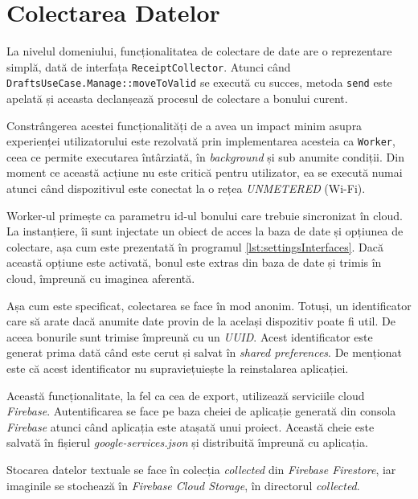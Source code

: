 \section{Colectarea Datelor}

La nivelul domeniului, funcționalitatea de colectare de date are o reprezentare simplă, dată de interfața \texttt{ReceiptCollector}. Atunci când \texttt{DraftsUseCase.Manage::moveToValid} se execută cu succes, metoda \texttt{send} este apelată și aceasta declanșează procesul de colectare a bonului curent.



Constrângerea acestei funcționalități de a avea un impact minim asupra experienței utilizatorului este rezolvată prin implementarea acesteia ca \texttt{Worker}, ceea ce permite executarea întârziată, în \emph{background} și sub anumite condiții. Din moment ce această acțiune nu este critică pentru utilizator, ea se execută numai atunci când dispozitivul este conectat la o rețea \emph{UNMETERED} (Wi-Fi).

Worker-ul primește ca parametru id-ul bonului care trebuie sincronizat în cloud. La instanțiere, îi sunt injectate un obiect de acces la baza de date și opțiunea de colectare, așa cum este prezentată în programul \ref{lst:settingsInterfaces}. Dacă această opțiune este activată, bonul este extras din baza de date și trimis în cloud, împreună cu imaginea aferentă.

Așa cum este specificat, colectarea se face în mod anonim. Totuși, un identificator care să arate dacă anumite date provin de la același dispozitiv poate fi util. De aceea bonurile sunt trimise împreună cu un \emph{UUID}. Acest identificator este generat prima dată când este cerut și salvat în \emph{shared preferences}. De menționat este că acest identificator nu supraviețuiește la reinstalarea aplicației.

Această funcționalitate, la fel ca cea de export, utilizează serviciile cloud \emph{Firebase}. Autentificarea se face pe baza cheiei de aplicație generată din consola \emph{Firebase} atunci când aplicația este atașată unui proiect. Această cheie este salvată în fișierul \emph{google-services.json} și distribuită împreună cu aplicația.

Stocarea datelor textuale se face în colecția \emph{collected} din \emph{Firebase Firestore}, iar imaginile se stochează în \emph{Firebase Cloud Storage}, în directorul \emph{collected}.
